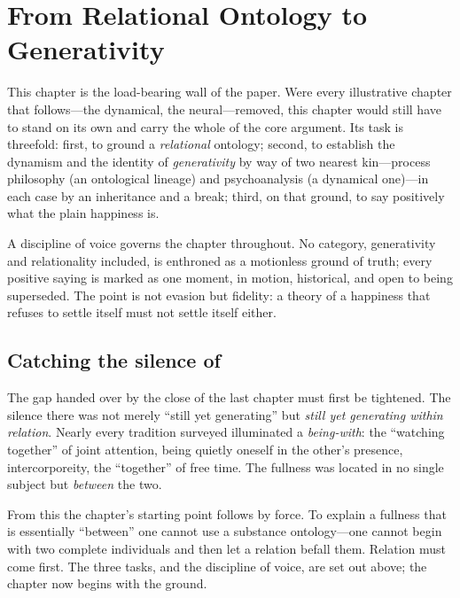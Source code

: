 \section{From Relational Ontology to Generativity}
\label{p19:sec:generativity}

\noindent
This chapter is the load-bearing wall of the paper. Were every illustrative chapter that follows---the dynamical, the neural---removed, this chapter would still have to stand on its own and carry the whole of the core argument. Its task is threefold: first, to ground a \emph{relational} ontology; second, to establish the dynamism and the identity of \emph{generativity} by way of two nearest kin---process philosophy (an ontological lineage) and psychoanalysis (a dynamical one)---in each case by an inheritance and a break; third, on that ground, to say positively what the plain happiness is.

A discipline of voice governs the chapter throughout. No category, generativity and relationality included, is enthroned as a motionless ground of truth; every positive saying is marked as one moment, in motion, historical, and open to being superseded. The point is not evasion but fidelity: a theory of a happiness that refuses to settle itself must not settle itself either.

\subsection{Catching the silence of }
\label{p19:sub:gen-catch}

The gap handed over by the close of the last chapter must first be tightened. The silence there was not merely ``still yet generating'' but \emph{still yet generating within relation}. Nearly every tradition surveyed illuminated a \emph{being-with}: the ``watching together'' of joint attention, being quietly oneself in the other's presence, intercorporeity, the ``together'' of free time. The fullness was located in no single subject but \emph{between} the two.

From this the chapter's starting point follows by force. To explain a fullness that is essentially ``between'' one cannot use a substance ontology---one cannot begin with two complete individuals and then let a relation befall them. Relation must come first. The three tasks, and the discipline of voice, are set out above; the chapter now begins with the ground.

